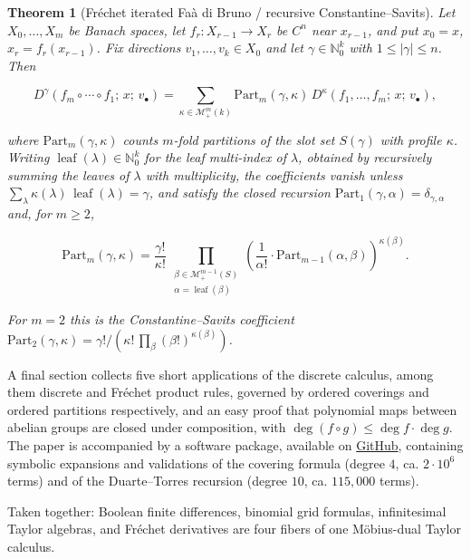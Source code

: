 \documentclass[10pt,a4paper]{article}
\theoremstyle{plain}
\newtheorem{theorem}{Theorem}
\theoremstyle{definition}
\newcommand{\IN}{\mathbb{N}} %
\newcommand{\1}{\mathbb{1}} %
\newcommand{\KM}{\mathcal{M}} %
\newcommand{\Part}{\mathrm{Part}} %
\DeclareMathOperator{\lf}{\mathrm{leaf}} %
\begin{document}
\begin{theorem}[Fréchet iterated Faà di Bruno / recursive Constantine--Savits]

Let \(X_0, \dots, X_m\) be Banach spaces, let \(f_r: X_{r-1} \to X_r\)
be \(C^n\) near \(x_{r-1}\), and put \(x_0 = x\),
\(x_r = f_r(x_{r-1})\). Fix directions \(v_1, \dots, v_k \in X_0\) and
let \(\gamma \in \IN_0^k\) with \(1 \leq |\gamma| \leq n\). Then

\[
  D^\gamma(f_m \circ \cdots \circ f_1;\, x;\, v_\bullet) = \sum_{\kappa \in \KM_+^m(k)} \Part_m(\gamma, \kappa)\, D^\kappa(f_1, \dots, f_m;\, x;\, v_\bullet),
\]

where \(\Part_m(\gamma, \kappa)\) counts \(m\)-fold partitions of the
slot set \(S(\gamma)\) with profile \(\kappa\). Writing
\(\lf(\lambda) \in \IN_0^k\) for the leaf multi-index of \(\lambda\),
obtained by recursively summing the leaves of \(\lambda\) with
multiplicity, the coefficients vanish unless
\(\sum_\lambda \kappa(\lambda)\, \lf(\lambda) = \gamma\), and satisfy
the closed recursion
\(\Part_1(\gamma, \alpha) = \delta_{\gamma, \alpha}\) and, for
\(m \geq 2\),

\[
  \Part_m(\gamma, \kappa) = \frac{\gamma!}{\kappa!}\, \prod_{\substack{\beta \in \KM_+^{m-1}(S) \\ \alpha = \lf(\beta)}} \left( \frac{1}{\alpha!} \cdot \Part_{m-1}(\alpha, \beta) \right)^{\kappa(\beta)}.
\]

For \(m = 2\) this is the Constantine--Savits coefficient
\(\Part_2(\gamma, \kappa) = \gamma! / (\kappa!\, \prod_\beta (\beta!)^{\kappa(\beta)})\).

\end{theorem}

A final section collects five short applications of the discrete
calculus, among them discrete and Fréchet product rules, governed by
ordered coverings and ordered partitions respectively, and an easy proof
that polynomial maps between abelian groups are closed under
composition, with \(\deg(f \circ g) \leq \deg f \cdot \deg g\). The
paper is accompanied by a software package, available on
\href{https://github.com/HeinrichHartmann/Discrete-Faa-di-Bruno}{GitHub},
containing symbolic expansions and validations of the covering formula
(degree \(4\), ca. \(2 \cdot 10^6\) terms) and of the Duarte--Torres
recursion (degree \(10\), ca. \(115{,}000\) terms).

Taken together: Boolean finite differences, binomial grid formulas,
infinitesimal Taylor algebras, and Fréchet derivatives are four fibers
of one Möbius-dual Taylor calculus.
\end{document}
